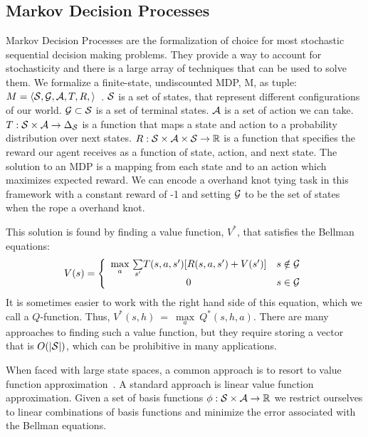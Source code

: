 \subsection{Markov Decision Processes}
Markov Decision Processes are the formalization of choice for most stochastic sequential decision making problems.
They provide a way to account for stochasticity and there is a large array of techniques that can be used to solve them.
We formalize a finite-state, undiscounted MDP, M, as tuple: $M = \langle\mathcal{S},\mathcal{G}, \mathcal{A},T,R, \rangle$~\cite{puterman1994}.
$\mathcal{S}{}$ is a set of states, that represent different configurations of our world.
$\mathcal{G}{} \subset \mathcal{S}{}$ is a set of terminal states.  
$\mathcal{A}{}$ is a set of action we can take.
$T:\mathcal{S}{} \times \mathcal{A}{} \rightarrow \Delta_{\mathcal{S}{}}$ is a function that maps a state and action to a probability distribution over next states.
$R:\mathcal{S}{}\times \mathcal{A}{} \times \mathcal{S}{} \rightarrow \mathbb{R}$ is a function that specifies the reward our agent receives as a function of state, action, and next state.
The solution to an MDP is a mapping from each state and to an action which maximizes expected reward. 
We can encode a overhand knot tying task in this framework with a constant reward of -1 
and setting $\mathcal{G}{}$ to be the set of states when the rope a overhand knot.

This solution is found by finding a value function, $V^*$, that satisfies the Bellman equations:
$${V(s) = \left\{ \begin{array}{cl} \underset{a}{\max}\ \underset{s'}{\sum} T(s, a, s')[R(s, a, s') + V(s')] & s\notin \mathcal{G}{}\\ 0 & s\in \mathcal{G}{}\end{array}\right.}$$
It is sometimes easier to work with the right hand side of this equation, which we call a $Q$-function. Thus, $V^*(s, h)~=~\underset{a}{\max}\ Q^*(s, h, a)$.
There are many approaches to finding such a value function, but they require storing a vector that is $O(|\mathcal{S}{}|)$, which can be prohibitive in many applications. 


When faced with large state spaces, a common approach is to resort to value function approximation~\cite{schweitzer1985generalized}. 
A standard approach is linear value function approximation. 
Given a set of basis functions $\phi: \mathcal{S}{}\times \mathcal{A}{} \rightarrow \mathbb{R}$ we restrict ourselves to linear combinations of basis functions
and minimize the error associated with the Bellman equations. 

